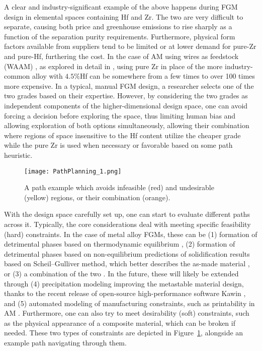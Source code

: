 A clear and industry-significant example of the above happens during FGM design in elemental spaces containing Hf and Zr. The two are very difficult to separate, causing both price and greenhouse emissions to rise sharply as a function of the separation purity requirements. Furthermore, physical form factors available from suppliers tend to be limited or at lower demand for pure-Zr and pure-Hf, furthering the cost. In 
the case of AM using wires as feedstock (WAAM) \cite{Shen2016FabricationProcess}, as explored in detail in , using pure Zr in place of the more industry-common alloy with $4.5\%$Hf can be somewhere from a few times to over 100 times more expensive. In a typical, manual FGM design, a researcher selects one of the two grades based on their expertise. However, by considering the two grades as independent components of the higher-dimensional design space, one can avoid forcing a decision before exploring the space, thus limiting human bias and allowing exploration of both options simultaneously, allowing their combination where regions of space insensitive to the Hf content utilize the cheaper grade while the pure Zr is used when necessary or favorable based on some path heuristic.

\begin{figure}[H]
    \centering
    \texttt{[image: PathPlanning\_1.png]}
    \vspace{-6pt}
    \caption{A path example which avoids infeasible (red) and undesirable (yellow) regions, or their combination (orange).} 
    \label{fig:pathplanning1}
\end{figure}

With the design space carefully set up, one can start to evaluate different paths across it. Typically, the core considerations deal with meeting specific feasibility (hard) constraints. In the case of metal alloy FGMs, these can be (1) formation of detrimental phases based on thermodynamic equilibrium \cite{Reichardt2021AdvancesMaterials}, (2) formation of detrimental phases based on non-equilibrium predictions of solidification results based on Scheil–Gulliver method, which better describes the as-made material \cite{Bocklund2020ExperimentalMaterials}, or (3) a combination of the two \cite{Bobbio2022DesignCompositions}. In the future, these will likely be extended through (4) precipitation modeling improving the metastable material design, thanks to the recent release of open-source high-performance software Kawin \cite{Ury2023Kawin:Model}, and (5) automated modeling of manufacturing constraints, such as printability in AM \cite{SheikhAnAlloys}. Furthermore, one can also try to meet desirability (soft) constraints, such as the physical appearance of a composite material, which can be broken if needed. These two types of constraints are depicted in Figure~\ref{fig:pathplanning1}, alongside an example path navigating through them.

